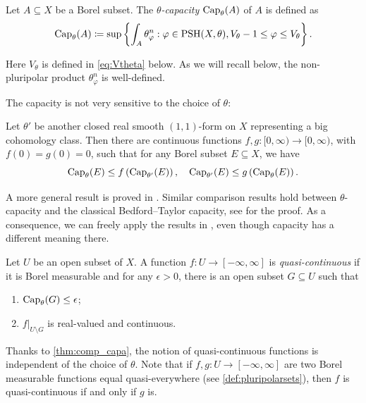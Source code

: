 \begin{definition}\label{def:cap}
    Let $A\subseteq X$ be a Borel subset. The \emph{$\theta$-capacity} $\operatorname{Cap}_{\theta}(A)$\index{$\Capa_{\theta}$} of $A$ is defined as
    \[
    \operatorname{Cap}_{\theta}(A)\coloneqq \sup\left\{ \int_A\theta_{\varphi}^n : \varphi\in \mathrm{PSH}(X,\theta),V_{\theta}-1\leq \varphi\leq V_{\theta} \right\}.
    \]
\end{definition}
Here $V_{\theta}$ is defined in \eqref{eq:Vtheta} below. As we will recall below, the non-pluripolar product $\theta_{\varphi}^n$ is well-defined.

The capacity is not very sensitive to the choice of $\theta$:
\begin{theorem}\label{thm:comp_capa}
    Let $\theta'$ be another closed real smooth $(1,1)$-form on $X$ representing a big cohomology class. Then there are continuous functions $f,g\colon [0,\infty)\rightarrow [0,\infty)$, with $f(0)=g(0)=0$, such that for any Borel subset $E\subseteq X$, we have
    \[
    \operatorname{Cap}_{\theta}(E)\leq f\left( \operatorname{Cap}_{\theta'}(E)\right),\quad \operatorname{Cap}_{\theta'}(E)\leq g\left( \operatorname{Cap}_{\theta}(E)\right).
    \]
\end{theorem}
A more general result is proved in \cite{Lu21}. Similar comparison results hold between $\theta$-capacity and the classical Bedford--Taylor capacity, see \cite[Section~9.2]{GZ17} for the proof. As a consequence, we can freely apply the results in \cite[Section~4.2]{GZ17}, even though capacity has a different meaning there.

\begin{definition}\label{def:qc_fun}
Let $U$ be an open subset of $X$.
    A function $f\colon U\rightarrow [-\infty,\infty]$ is \emph{quasi-continuous} if it is Borel measurable and for any $\epsilon>0$, there is an open subset $G\subseteq U$ such that
    \begin{enumerate}
        \item\label{itm:def:qc_fun:1} $\operatorname{Cap}_{\theta}(G)\leq \epsilon$;
        \item\label{itm:def:qc_fun:2} $f|_{U\setminus G}$ is real-valued and continuous.
    \end{enumerate}
\end{definition}
Thanks to \cref{thm:comp_capa}, the notion of quasi-continuous functions is independent of the choice of $\theta$. Note that if $f,g\colon U\rightarrow [-\infty,\infty]$ are two Borel measurable functions equal quasi-everywhere (see \cref{def:pluripolarsets}), then $f$ is quasi-continuous if and only if $g$ is.

